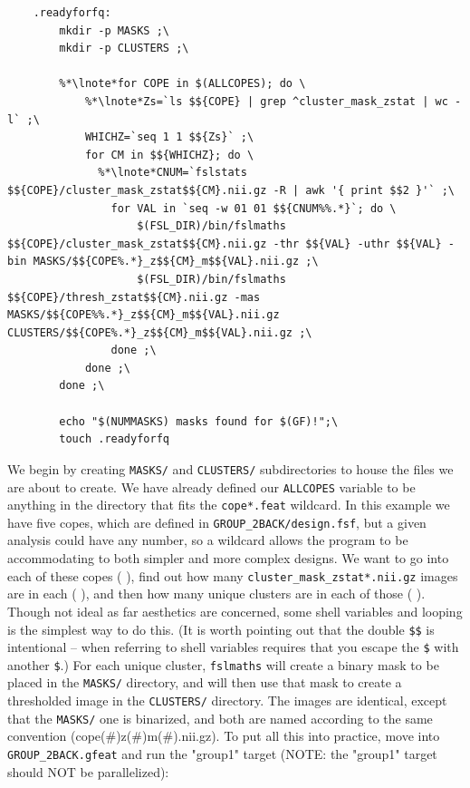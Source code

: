 \begin{lstlisting}
	.readyforfq:
		mkdir -p MASKS ;\
		mkdir -p CLUSTERS ;\
		
		%*\lnote*for COPE in $(ALLCOPES); do \
			%*\lnote*Zs=`ls $${COPE} | grep ^cluster_mask_zstat | wc -l` ;\
			WHICHZ=`seq 1 1 $${Zs}` ;\
			for CM in $${WHICHZ}; do \
			  %*\lnote*CNUM=`fslstats $${COPE}/cluster_mask_zstat$${CM}.nii.gz -R | awk '{ print $$2 }'` ;\
				for VAL in `seq -w 01 01 $${CNUM%%.*}`; do \
					$(FSL_DIR)/bin/fslmaths $${COPE}/cluster_mask_zstat$${CM}.nii.gz -thr $${VAL} -uthr $${VAL} -bin MASKS/$${COPE%.*}_z$${CM}_m$${VAL}.nii.gz ;\
					$(FSL_DIR)/bin/fslmaths $${COPE}/thresh_zstat$${CM}.nii.gz -mas MASKS/$${COPE%%.*}_z$${CM}_m$${VAL}.nii.gz CLUSTERS/$${COPE%.*}_z$${CM}_m$${VAL}.nii.gz ;\
				done ;\
			done ;\
		done ;\
		
		echo "$(NUMMASKS) masks found for $(GF)!";\
		touch .readyforfq
\end{lstlisting}

We begin by creating \texttt{MASKS/} and \texttt{CLUSTERS/} subdirectories to house the files we are about to create. We have already defined our \texttt{ALLCOPES} variable to be anything in the directory that fits the \texttt{cope*.feat} wildcard. In this example we have five copes, which are defined in \texttt{GROUP_2BACK/design.fsf}, but a given analysis could have any number, so a wildcard allows the program to be accommodating to both simpler and more complex designs. We want \maken{} to go into each of these copes ( ), find out how many \texttt{cluster_mask_zstat*.nii.gz} images are in each ( ), and then how many unique clusters are in each of those ( ). Though not ideal as far aesthetics are concerned, some shell variables and looping is the simplest way to do this.  (It is worth pointing out that the double \texttt{\$\$} is intentional -- when referring to shell variables \maken{} requires that you escape the \texttt{\$} with another \texttt{\$}.) For each unique cluster, \texttt{fslmaths} will create a binary mask to be placed in the \texttt{MASKS/} directory, and will then use that mask to create a thresholded image in the \texttt{CLUSTERS/} directory. The images are identical, except that the \texttt{MASKS/} one is binarized, and both are named according to the same convention (cope(\#)z(\#)m(\#).nii.gz). To put all this into practice, move into \texttt{GROUP_2BACK.gfeat} and run the "group1" target (NOTE: the "group1" target should NOT be parallelized):

